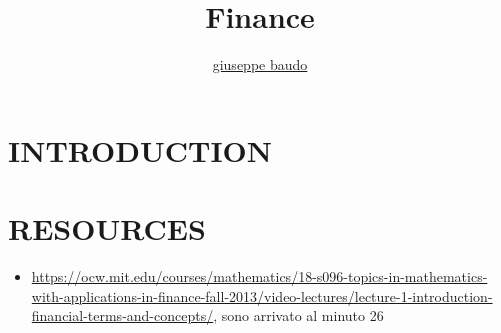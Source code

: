 \documentclass[a4paper,10pt]{article}
\title{Finance}
\author{\href{http://www.baudo.hol.es}{giuseppe baudo}}
\begin{document}
\maketitle

\section{INTRODUCTION}


\section{RESOURCES}
\begin{itemize}
 \item \url{https://ocw.mit.edu/courses/mathematics/18-s096-topics-in-mathematics-with-applications-in-finance-fall-2013/video-lectures/lecture-1-introduction-financial-terms-and-concepts/}, sono arrivato al minuto 26
\end{itemize}
\end{document}
